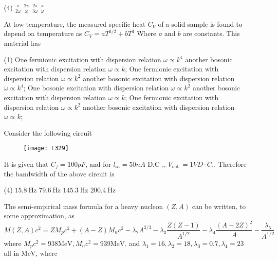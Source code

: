 \begin{questions}
\begin{tasks}(4)
	\task[\textbf{A.}] $\frac{\pi}{2 \omega}$
	\task[\textbf{B.}] $\frac{2 \pi}{\omega}$
	\task[\textbf{C.}] $\frac{2 \pi}{3 \omega}$
	\task[\textbf{D.}]   $\frac{\pi}{\omega}$
\end{tasks}
\begin{minipage}{\textwidth}
	\question At low temperature, the measured specific heat $C_{V}$ of a solid sample is found to depend on temperature as $C_{V}=a T^{3 / 2}+b T^{3}$
	Where $a$ and $b$ are constants. This material has
\end{minipage}
\begin{tasks}(1)
	\task[\textbf{A.}] One fermionic excitation with dispersion relation $\omega \propto k^{4}$ another bosonic excitation with dispersion relation $\omega \propto k$;
	\task[\textbf{B.}] One fermionic excitation with dispersion relation $\omega \propto k^{2}$ another bosonic excitation with dispersion relation $\omega \propto k^{4}$;
	\task[\textbf{C.}] One bosonic excitation with dispersion relation $\omega \propto k^{2}$ another bosonic excitation with dispersion relation $\omega \propto k$;
	\task[\textbf{D.}] One fermionic excitation with dispersion relation $\omega \propto k^{2}$ another bosonic excitation with dispersion relation $\omega \propto k$;
\end{tasks}
\begin{minipage}{\textwidth}
	\question Consider the following circuit\\
	\begin{figure}[H]
		\centering
		\texttt{[image: t329]}
	\end{figure}
	It is given that $C_{f}=100 p F$, and for $l_{i n}=50 n A$   D.C ,, $V_{\text {out }}=1 V D \cdot C$,. Therefore the bandwidth of the above circuit is
\end{minipage}
\begin{tasks}(4)
	\task[\textbf{A.}]   $15.8 \mathrm{~Hz}$
	\task[\textbf{B.}] $79.6 \mathrm{~Hz}$
	\task[\textbf{C.}] $145.3 \mathrm{~Hz}$
	\task[\textbf{D.}] $200.4 \mathrm{~Hz}$
\end{tasks}
\begin{minipage}{\textwidth}
	\question The semi-empirical mass formula for a heavy nucleon $(Z, A)$ can be written, to some approximation, as
	$$
	M(Z, A) c^{2}=Z M_{p} c^{2}+(A-Z) M_{n} c^{2}-\lambda_{2} A^{2 / 3}-\lambda_{3} \frac{Z(Z-1)}{A^{1 / 2}}-\lambda_{4} \frac{(A-2 Z)^{2}}{A}-\frac{\lambda_{5}}{A^{1 / 2}}
	$$
	where $M_{p} c^{2}=938 \mathrm{MeV}, M_{n} c^{2}=939 \mathrm{MeV}$, and $\lambda_{1}=16, \lambda_{2}=18, \lambda_{3}=0.7, \lambda_{4}=23$ all in $\mathrm{MeV}$, where

\end{minipage}
\end{questions}
